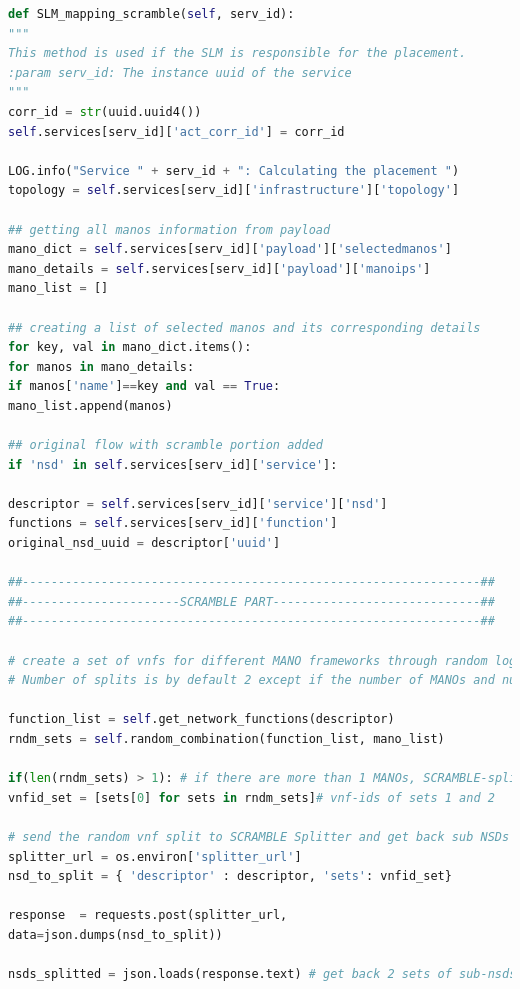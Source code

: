 \begin{lstlisting}[language=Python,caption=Extended \textbf{SLM\_mapping\_scramble} function, label=lis:SLM_scramble]
def SLM_mapping_scramble(self, serv_id):
"""
This method is used if the SLM is responsible for the placement.
:param serv_id: The instance uuid of the service
"""
corr_id = str(uuid.uuid4())
self.services[serv_id]['act_corr_id'] = corr_id

LOG.info("Service " + serv_id + ": Calculating the placement ")
topology = self.services[serv_id]['infrastructure']['topology']

## getting all manos information from payload
mano_dict = self.services[serv_id]['payload']['selectedmanos']
mano_details = self.services[serv_id]['payload']['manoips']
mano_list = []

## creating a list of selected manos and its corresponding details
for key, val in mano_dict.items():
for manos in mano_details:
if manos['name']==key and val == True:
mano_list.append(manos)

## original flow with scramble portion added
if 'nsd' in self.services[serv_id]['service']:

descriptor = self.services[serv_id]['service']['nsd']
functions = self.services[serv_id]['function']
original_nsd_uuid = descriptor['uuid']

##----------------------------------------------------------------##
##----------------------SCRAMBLE PART-----------------------------##
##----------------------------------------------------------------##

# create a set of vnfs for different MANO frameworks through random logic
# Number of splits is by default 2 except if the number of MANOs and number of VNFs are equal.

function_list = self.get_network_functions(descriptor)
rndm_sets = self.random_combination(function_list, mano_list)

if(len(rndm_sets) > 1): # if there are more than 1 MANOs, SCRAMBLE-splitter is called to split the NSD
vnfid_set = [sets[0] for sets in rndm_sets]# vnf-ids of sets 1 and 2

# send the random vnf split to SCRAMBLE Splitter and get back sub NSDs for each split.
splitter_url = os.environ['splitter_url'] 
nsd_to_split = { 'descriptor' : descriptor, 'sets': vnfid_set}

response  = requests.post(splitter_url,
data=json.dumps(nsd_to_split))

nsds_splitted = json.loads(response.text) # get back 2 sets of sub-nsds


\end{lstlisting}
